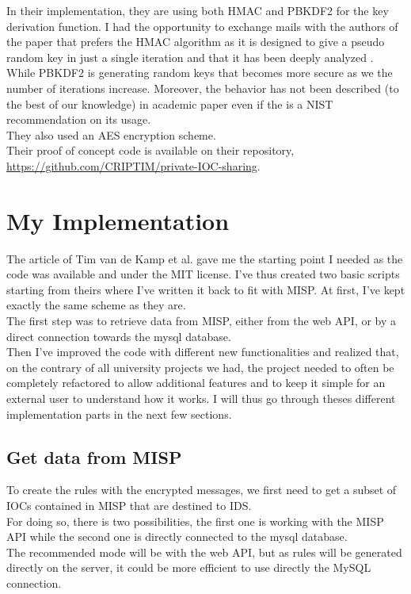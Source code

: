 \documentclass{eplmastersthesis}
\begin{document}
In their implementation, they are using both HMAC and PBKDF2 for the key derivation function. I had the opportunity to exchange mails with the authors of the paper that prefers the HMAC algorithm as it is designed to give a pseudo random key in just a single iteration and that it has been deeply analyzed \cite{cryptoeprint}. While PBKDF2 is generating random keys that becomes more secure as we the number of iterations increase. Moreover, the behavior has not been described (to the best of our knowledge) in academic paper even if the is a NIST recommendation on its usage.\\
They also used an AES encryption scheme.\\

Their proof of concept code is available on their repository, \url{https://github.com/CRIPTIM/private-IOC-sharing}. 


\section{My Implementation}
The article of Tim van de Kamp et al. gave me the starting point I needed as the code was available and under the MIT license. I've thus created two basic scripts starting from theirs where I've written it back to fit with MISP. At first, I've kept exactly the same scheme as they are.\\
The first step was to retrieve data from MISP, either from the web API, or by a direct connection towards the mysql database.\\
Then I've improved the code with different new functionalities and realized that, on the contrary of all university projects we had, the project needed to often be completely refactored to allow additional features and to keep it simple for an external user to understand how it works. I will thus go through theses different implementation parts in the next few sections.\\

\subsection{Get data from MISP}
To create the rules with the encrypted messages, we first need to get a subset of IOCs contained in MISP that are destined to IDS. \\
For doing so, there is two possibilities, the first one is working with the MISP API while the second one is directly connected to the mysql database. \\
The recommended mode will be with the web API, but as rules will be generated directly on the server, it could be more efficient to use directly the MySQL connection.\\
\end{document}

